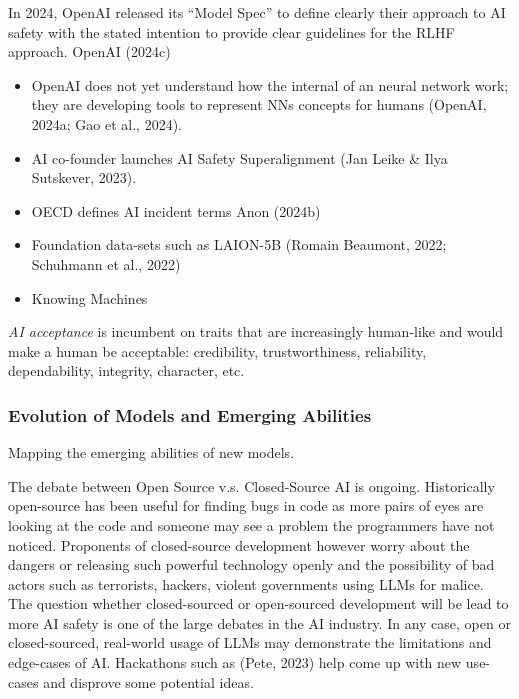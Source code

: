 \documentclass[
  letterpaper,
  DIV=11,
  numbers=noendperiod]{scrartcl}
\begin{document}
In 2024, OpenAI released its ``Model Spec'' to define clearly their
approach to AI safety with the stated intention to provide clear
guidelines for the RLHF approach. OpenAI (2024c)

\begin{itemize}
\item
  OpenAI does not yet understand how the internal of an neural network
  work; they are developing tools to represent NNs concepts for humans
  (OpenAI, 2024a; Gao et al., 2024).
\item
  AI co-founder launches AI Safety Superalignment (Jan Leike \& Ilya
  Sutskever, 2023).
\item
  OECD defines AI incident terms Anon (2024b)
\item
  Foundation data-sets such as LAION-5B (Romain Beaumont, 2022;
  Schuhmann et al., 2022)
\item
  Knowing Machines
\end{itemize}

\emph{AI acceptance} is incumbent on traits that are increasingly
human-like and would make a human be acceptable: credibility,
trustworthiness, reliability, dependability, integrity, character, etc.

\subsubsection{Evolution of Models and Emerging
Abilities}\label{evolution-of-models-and-emerging-abilities}

Mapping the emerging abilities of new models.

The debate between Open Source v.s. Closed-Source AI is ongoing.
Historically open-source has been useful for finding bugs in code as
more pairs of eyes are looking at the code and someone may see a problem
the programmers have not noticed. Proponents of closed-source
development however worry about the dangers or releasing such powerful
technology openly and the possibility of bad actors such as terrorists,
hackers, violent governments using LLMs for malice. The question whether
closed-sourced or open-sourced development will be lead to more AI
safety is one of the large debates in the AI industry. In any case, open
or closed-sourced, real-world usage of LLMs may demonstrate the
limitations and edge-cases of AI. Hackathons such as (Pete, 2023) help
come up with new use-cases and disprove some potential ideas.
\end{document}
